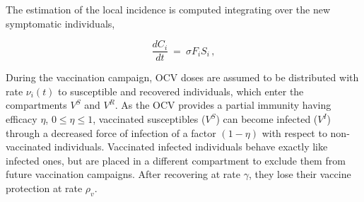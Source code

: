 The estimation of the local incidence is computed integrating over the new symptomatic individuals,

\begin{equation}
\frac{d C_i}{dt} \ = \ \sigma F_i S_i  \, , \label{eq:C}
\end{equation}

During the vaccination campaign, OCV doses are assumed to be distributed with rate $\nu_i(t)$ to susceptible and recovered individuals, which enter the compartments $V^S$ and $V^R$. As the OCV provides a partial immunity having efficacy $\eta$, $0\leq \eta \leq 1$, vaccinated susceptibles ($V^S$) can become infected ($V^I$) through a decreased force of infection of a factor $(1-\eta)$ with respect to non-vaccinated individuals. Vaccinated infected individuals behave exactly like infected ones, but are placed in a different compartment to exclude them from future vaccination campaigns. After recovering at  rate $\gamma$, they lose their vaccine protection at rate $\rho_{v}$.





